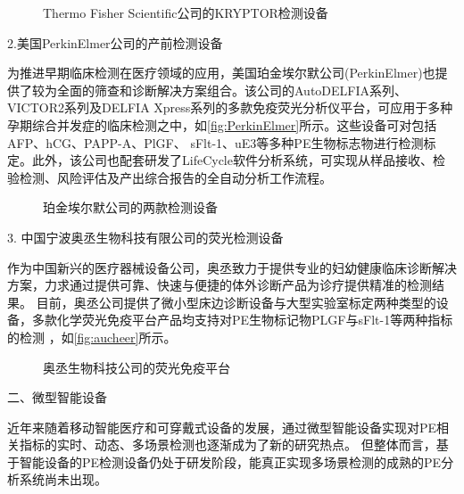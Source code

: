 \begin{figure}[htbp]
    \centering
    \quad
    \caption{\label{fig:B·R·A·H·M·S}Thermo Fisher Scientific公司的KRYPTOR检测设备}
\end{figure}
2.美国PerkinElmer公司的产前检测设备

为推进早期临床检测在医疗领域的应用，美国珀金埃尔默公司(PerkinElmer)也提供了较为全面的筛查和诊断解决方案组合。该公司的AutoDELFIA系列、
VICTOR2系列及DELFIA Xpress系列的多款免疫荧光分析仪平台，可应用于多种孕期综合并发症的临床检测之中，如\autoref{fig:PerkinElmer}所示。这些设备可对包括AFP、hCG、PAPP-A、PlGF、
sFlt-1、uE3等多种PE生物标志物进行检测标定。此外，该公司也配套研发了LifeCycle软件分析系统，可实现从样品接收、检验检测、风险评估及产出综合报告的全自动分析工作流程。
\begin{figure}[h]
    \centering
    \quad
    \caption{\label{fig:PerkinElmer}珀金埃尔默公司的两款检测设备}
\end{figure}

3. 中国宁波奥丞生物科技有限公司的荧光检测设备

作为中国新兴的医疗器械设备公司，奥丞致力于提供专业的妇幼健康临床诊断解决方案，力求通过提供可靠、快速与便捷的体外诊断产品为诊疗提供精准的检测结果。
目前，奥丞公司提供了微小型床边诊断设备与大型实验室标定两种类型的设备，多款化学荧光免疫平台产品均支持对PE生物标记物PLGF与sFlt-1等两种指标的检测\cite{aucheer2021}
，如\autoref{fig:aucheer}所示。
\begin{figure}[h]
    \centering
    \quad
    \caption{\label{fig:aucheer}奥丞生物科技公司的荧光免疫平台}
\end{figure}


二、微型智能设备

近年来随着移动智能医疗和可穿戴式设备的发展，通过微型智能设备实现对PE相关指标的实时、动态、多场景检测也逐渐成为了新的研究热点。
但整体而言，基于智能设备的PE检测设备仍处于研发阶段，能真正实现多场景检测的成熟的PE分析系统尚未出现。

